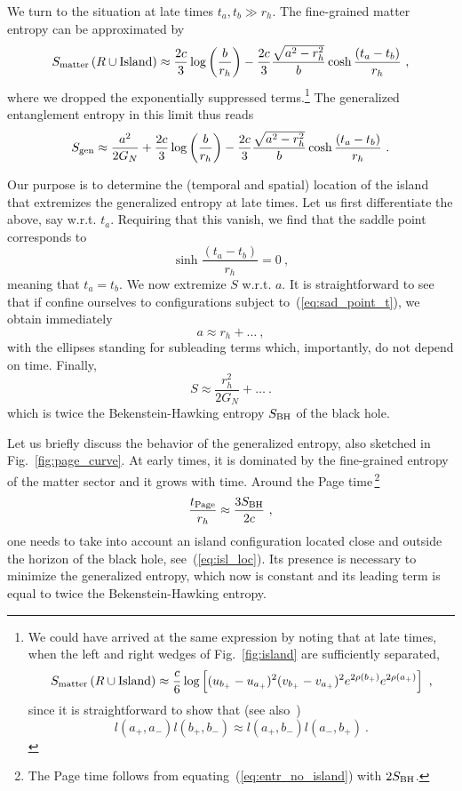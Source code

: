 \documentclass[a4paper, 12pt]{article}
\def\be{\begin{equation}}
\def\ee{\end{equation}}
\begin{document}
We turn to the situation at late times $t_a,t_b\gg r_h$. The fine-grained matter entropy can be approximated by 
\be
S_{\rm matter}\left(R\cup\text{Island}\right) \approx \frac {2c}{3} \log \left(\frac{b}{r_h}\right)-\frac {2c}{3} \frac{\sqrt{a^2-r_h^2}}{b}\cosh\frac{(t_a-t_b)}{r_h} \ ,
\ee
where we dropped the exponentially suppressed terms.\footnote{We could have arrived at the same expression by noting that at late times, when the left and right wedges of Fig.~\ref{fig:island} are sufficiently separated,
\be
S_{\rm matter}\left(R\cup\text{Island}\right)\approx \frac{c}{6} \log \left[(u_{b_+}-u_{a_+})^2 (v_{b_+}-v_{a_+})^2e^{2\rho(b_+)}e^{2\rho(a_+)}\right] \ ,
\ee
since it is straightforward to show that (see also~\cite{Hashimoto:2020cas})
\be
l(a_+,a_-)l(b_+,b_-)\approx l(a_+,b_-)l(a_-,b_+) \ .
\ee
}
The generalized entanglement entropy in this limit thus reads
\be
S_{\rm gen} \approx \frac{a^2}{2G_N} + \frac{2c}{3} \log \left(\frac{b}{r_h}\right)-\frac{2c}{3} \frac{\sqrt{a^2-r_h^2}}{b}\cosh\frac{(t_a-t_b)}{r_h} \ . 
\ee

Our purpose is to determine the (temporal and spatial) location of the island that extremizes the generalized entropy at late times. Let us first differentiate the above, say w.r.t. $t_a$. Requiring that this vanish, we find that the saddle point corresponds to 
\be
\label{eq:sad_point_t}
\sinh\frac{(t_a-t_b)}{r_h} = 0 \ ,
\ee
meaning that $t_a = t_b$. We now extremize $S$ w.r.t. $a$. It is straightforward to see that if 
confine ourselves to configurations subject to~(\ref{eq:sad_point_t}), we obtain immediately
\be
\label{eq:isl_loc}
a\approx r_h + \ldots \ ,
\ee
with the ellipses standing for subleading terms which, importantly, do not depend on time. 
Finally, 
\be
\label{eq:sgen_einstein}
S \approx \frac{ r_h^2}{2G_N} + \ldots \ .
\ee
which is twice the Bekenstein-Hawking entropy $S_{\rm BH}$ of the black hole.

Let us briefly discuss the behavior of the generalized entropy, also sketched in Fig.~\ref{fig:page_curve}. At early times, it is dominated by the fine-grained entropy of the matter sector and it grows with time. Around the Page time\,\footnote{The Page time follows from equating~(\ref{eq:entr_no_island}) with $2S_{\rm BH}$.}
\be
\frac{t_{\rm Page}}{r_h} \approx \frac{3S_{\rm BH}}{2c} \ ,
\ee
one needs to take into account an island configuration located close and outside the horizon of the black hole, see~(\ref{eq:isl_loc}). Its presence is necessary to minimize the generalized entropy, which now is constant and its leading term is equal to twice the Bekenstein-Hawking entropy. 
\end{document}
